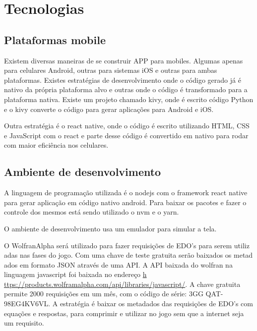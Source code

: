 \chapter[Tecnologias]{Tecnologias}

\section[Plataformas mobile]{Plataformas mobile}
Existem diversas maneiras de se construir APP para mobiles. Algumas apenas para celulares Android, outras para sistemas iOS e outras para ambas plataformas. Existes estratégias de desenvolvimento onde o código gerado já é nativo da própria plataforma alvo e outras onde o código é transformado para a plataforma nativa.
Existe um  projeto chamado kivy, onde é escrito código Python e o kivy converte o código para gerar aplicações para Android e iOS.

Outra estratégia é o react native, onde o código é escrito utilizando HTML, CSS e JavaScript com o react e parte desse código é convertido em nativo para rodar com maior eficiência nos celulares.

\section[Ambiente de desenvolvimento]{Ambiente de desenvolvimento}

A linguagem de programação utilizada é o nodejs com o framework react native para gerar aplicação em código nativo android. Para baixar os pacotes e fazer o controle dos mesmos está sendo utilizado o nvm e o yarn.

O ambiente de desenvolvimento usa um emulador para simular a tela.

O WolfranAlpha será utilizado para fazer requisições de EDO's para serem utiliz    adas nas fases do jogo. Com uma chave de teste gratuita serão baixados os metad    ados em formato JSON através de uma API.
A API baixada do wolfran na linguagem javascript foi baixada no endereço \url{h    ttps://products.wolframalpha.com/api/libraries/javascript/}.
A chave gratuita permite 2000 requisições em um mês, com o código de série: 3GG    QAT-98EG4KV6VL. A estratégia é baixar os metadados das requisições de EDO's com     equações e respostas, para comprimir e utilizar no jogo sem que a internet seja um requisito.
